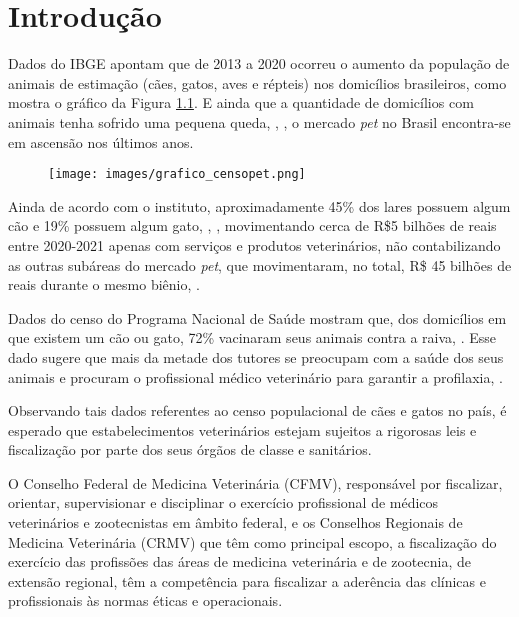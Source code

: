 \documentclass[
    12pt,               %
    openright,          %
    oneside,
    a4paper,            %
    BIBLATEX,           %
    TODO,               %
    english,            %
    brazil              %
    ]{ifsp-spo-inf-ctds}
\providecommand{\DIFadd}[1]{{\protect\color{blue}\uwave{#1}}} %
\providecommand{\DIFaddbegin}{} %
\providecommand{\DIFaddend}{} %
\providecommand{\DIFdelbegin}{} %
\providecommand{\DIFdelend}{} %
\providecommand{\DIFaddFL}[1]{\DIFadd{#1}} %
\newcommand{\DIFscaledelfig}{0.5}
\newlength{\DIFdelgraphicswidth} %
\newlength{\DIFdelgraphicsheight} %
\newcommand{\DIFaddincludegraphics}[2][]{{\color{blue}\fbox{\DIFOincludegraphics[#1]{#2}}}} %
\newcommand{\DIFdelincludegraphics}[2][]{%
\sbox{\DIFdelgraphicsbox}{\DIFOincludegraphics[#1]{#2}}%
\settoboxwidth{\DIFdelgraphicswidth}{\DIFdelgraphicsbox} %
\settoboxtotalheight{\DIFdelgraphicsheight}{\DIFdelgraphicsbox} %
\scalebox{\DIFscaledelfig}{%
\parbox[b]{\DIFdelgraphicswidth}{\usebox{\DIFdelgraphicsbox}\\[-\baselineskip] \rule{\DIFdelgraphicswidth}{0em}}\llap{\resizebox{\DIFdelgraphicswidth}{\DIFdelgraphicsheight}{%
\setlength{\unitlength}{\DIFdelgraphicswidth}%
\begin{picture}(1,1)%
\thicklines\linethickness{2pt} %
{\color[rgb]{1,0,0}\put(0,0){\framebox(1,1){}}}%
{\color[rgb]{1,0,0}\put(0,0){\line( 1,1){1}}}%
{\color[rgb]{1,0,0}\put(0,1){\line(1,-1){1}}}%
\end{picture}%
}\hspace*{3pt}}} %
} %
\DeclareRobustCommand{\DIFaddbegin}{\DIFOaddbegin \let\includegraphics\DIFaddincludegraphics} %
\DeclareRobustCommand{\DIFaddend}{\DIFOaddend \let\includegraphics\DIFOincludegraphics} %
\DeclareRobustCommand{\DIFdelbegin}{\DIFOdelbegin \let\includegraphics\DIFdelincludegraphics} %
\DeclareRobustCommand{\DIFdelend}{\DIFOaddend \let\includegraphics\DIFOincludegraphics} %
\begin{document}
\chapter[Introdução]{Introdução} \label{intro}
    \DIFdelbegin %

\DIFdelend Dados do IBGE apontam que de 2013 a 2020 ocorreu o aumento da população de animais de estimação (cães, gatos, aves e répteis) nos domicílios brasileiros, como mostra o gráfico da Figura \ref{fig:grafico_pet}. E ainda que a quantidade de domicílios com animais tenha sofrido uma pequena queda, , , o mercado \emph{pet} no Brasil encontra-se em ascensão nos últimos anos.


    \DIFaddbegin \begin{figure}[H]
        \centering
        \texttt{[image: images/grafico\_censopet.png]}
        \caption{\DIFaddFL{Censo população Pet no Brasil, \mbox{%
\citeonline{ibge2013, ibge2018, pet2021}}\hspace{0pt}%
}}
        \label{fig:grafico_pet}
    \end{figure}

    \DIFaddend Ainda de acordo com o instituto, aproximadamente 45\% dos lares possuem algum cão e 19\% possuem algum gato, , , movimentando cerca de R\$5 bilhões de reais entre 2020-2021 apenas com serviços e produtos veterinários, não contabilizando as outras subáreas do mercado \emph{pet}, que movimentaram, no total, R\$ 45 bilhões de reais durante o mesmo biênio, .

    Dados do censo do Programa Nacional de Saúde mostram que, dos domicílios em que existem um cão ou gato, 72\% vacinaram seus animais contra a raiva,
    . Esse dado sugere que mais da metade dos tutores se preocupam com a saúde dos seus animais e procuram o profissional médico veterinário para garantir a profilaxia, .

    Observando tais dados referentes ao censo populacional de cães e gatos no país, é esperado que estabelecimentos veterinários estejam sujeitos a rigorosas leis e fiscalização por parte dos seus órgãos de classe e sanitários.

    O Conselho Federal de Medicina Veterinária (CFMV), responsável por fiscalizar, orientar, supervisionar e disciplinar o exercício profissional de médicos veterinários e zootecnistas em âmbito federal, e os Conselhos Regionais de Medicina Veterinária (CRMV) que têm como principal escopo, a fiscalização do exercício das profissões das áreas de medicina veterinária e de zootecnia, de extensão regional,  têm a competência para fiscalizar a aderência das clínicas e profissionais às normas éticas e operacionais.
\end{document}
